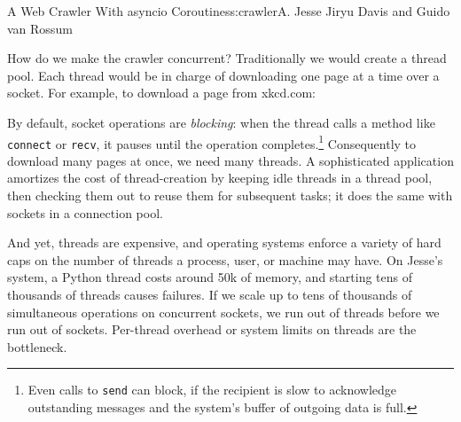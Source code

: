 \begin{aosachapter}{A Web Crawler With asyncio Coroutines}{s:crawler}{A. Jesse Jiryu Davis and Guido van Rossum}
\label{the-traditional-approach}

How do we make the crawler concurrent? Traditionally we would create a
thread pool. Each thread would be in charge of downloading one page at a
time over a socket. For example, to download a page from xkcd.com:

\begin{Shaded}
\begin{Highlighting}[]
 
    \NormalTok{((}\NormalTok{, }\NormalTok{))}
    \NormalTok{))}
    \NormalTok{)}
     
        \NormalTok{)}
    
\end{Highlighting}
\end{Shaded}

By default, socket operations are \emph{blocking}: when the thread calls
a method like \texttt{connect} or \texttt{recv}, it pauses until the
operation completes.\footnote{Even calls to \texttt{send} can block, if
  the recipient is slow to acknowledge outstanding messages and the
  system's buffer of outgoing data is full.} Consequently to download
many pages at once, we need many threads. A sophisticated application
amortizes the cost of thread-creation by keeping idle threads in a
thread pool, then checking them out to reuse them for subsequent tasks;
it does the same with sockets in a connection pool.

And yet, threads are expensive, and operating systems enforce a variety
of hard caps on the number of threads a process, user, or machine may
have. On Jesse's system, a Python thread costs around 50k of memory, and
starting tens of thousands of threads causes failures. If we scale up to
tens of thousands of simultaneous operations on concurrent sockets, we
run out of threads before we run out of sockets. Per-thread overhead or
system limits on threads are the bottleneck.


\end{aosachapter}
